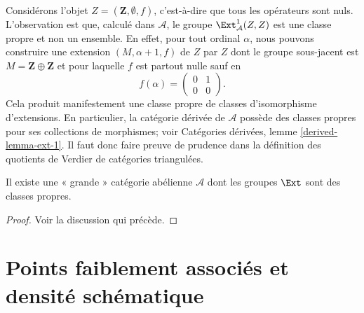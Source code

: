 \medskip\noindent
Considérons l'objet $Z = (\mathbf{Z}, \emptyset, f)$, c'est-à-dire que tous les
opérateurs sont nuls. L'observation est que,
calculé dans $\mathcal{A}$, le groupe $\Ext^1_\mathcal{A}(Z, Z)$ est une classe propre
et non un ensemble. En effet, pour tout ordinal $\alpha$, nous pouvons construire une extension
$(M, \alpha + 1, f)$ de $Z$ par $Z$ dont le groupe sous-jacent est
$M = \mathbf{Z} \oplus \mathbf{Z}$ et pour laquelle $f$ est
partout nulle sauf en
$$
f(\alpha) =
\left(
\begin{matrix}
0 & 1 \\
0 & 0
\end{matrix}
\right).
$$
Cela produit manifestement une classe propre de classes d'isomorphisme d'extensions.
En particulier, la catégorie dérivée de $\mathcal{A}$ possède des classes propres pour
ses collections de morphismes; voir
Catégories dérivées, lemme \ref{derived-lemma-ext-1}. Il faut donc faire preuve
de prudence dans la définition des quotients de Verdier de catégories
triangulées.

\begin{lemma}
\label{lemma-big-abelian-category}
Il existe une « grande » catégorie abélienne $\mathcal{A}$ dont les
groupes $\Ext$ sont des classes propres.
\end{lemma}

\begin{proof}
Voir la discussion qui précède.
\end{proof}





\section{Points faiblement associés et densité schématique}
\label{section-weak-ass-dense}

